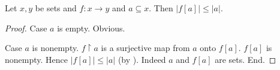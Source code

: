 \documentclass[10pt]{article}
\begin{document}
  \begin{forthel}
    \begin{proposition}[id=SET_THEORY_06_8113916590686208,printid]
      Let $x, y$ be sets and $f : x \to y$ and $a \subseteq x$.
      Then $|f[a]| \leq |a|$.
    \end{proposition}
    \begin{proof}
      Case $a$ is empty. Obvious.

      Case $a$ is nonempty.
        $f \restriction a$ is a surjective map from $a$ onto $f[a]$.
        $f[a]$ is nonempty.
        Hence $|f[a]| \leq |a|$ (by ).
        Indeed $a$ and $f[a]$ are sets.
      End.
    \end{proof}
  \end{forthel}
\end{document}
